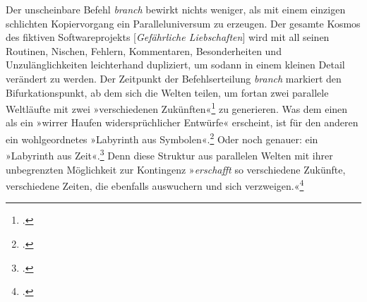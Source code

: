 \documentclass[a4paper,11pt]{article}
\newcommand{\anf}[1]{»#1«}
\begin{document}
Der unscheinbare Befehl \emph{branch} bewirkt nichts weniger, als mit einem einzigen schlichten Kopiervorgang ein Paralleluniversum zu erzeugen. Der gesamte Kosmos des fiktiven Softwareprojekts [\emph{Gefährliche Liebschaften}] wird mit all seinen Routinen, Nischen, Fehlern, Kommentaren, Besonderheiten und Unzulänglichkeiten leichterhand dupliziert, um sodann in einem kleinen Detail verändert zu werden. Der Zeitpunkt der Befehlserteilung \emph{branch} markiert den Bifurkationspunkt, ab dem sich die Welten teilen, um fortan zwei parallele Weltläufte mit zwei \anf{verschiedenen Zukünften}\footcite[169]{borges:1941} zu generieren. Was dem einen als ein \anf{wirrer Haufen widersprüchlicher Entwürfe} erscheint, ist für den anderen ein wohlgeordnetes \anf{Labyrinth aus Symbolen}.\footcite[168]{borges:1941} Oder noch genauer: ein \anf{Labyrinth aus Zeit}.\footcite[168]{borges:1941} Denn diese Struktur aus parallelen Welten mit ihrer unbegrenzten Möglichkeit zur Kontingenz \anf{\emph{erschafft} so verschiedene Zukünfte, verschiedene Zeiten, die ebenfalls auswuchern und sich verzweigen.}\footcite[170]{borges:1941} 
\end{document}
